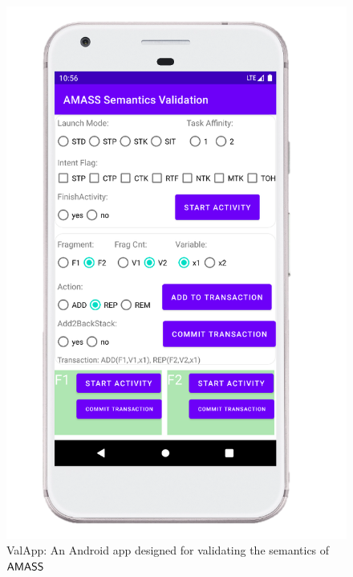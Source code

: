 \begin{figure}[htbp]
\centering
\includegraphics[scale=0.5]{ValApp.png}
\caption{ValApp: An Android app designed for validating the semantics of $\textsf{AMASS}$}
\label{fig:valapp}
\end{figure}




